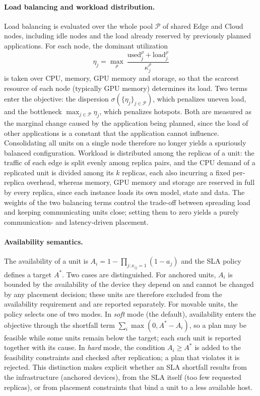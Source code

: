 \paragraph{Load balancing and workload distribution.}
Load balancing is evaluated over the whole pool $\mathcal{P}$ of shared Edge
and Cloud nodes, including idle nodes and the load already reserved by
previously planned applications. For each node, the dominant utilization
\begin{equation}
\eta_j = \max_{\rho}\ \frac{\text{used}_j^{\rho} + \text{load}_j^{\rho}}{\kappa_j^{\rho}}
\end{equation}
is taken over CPU, memory, GPU memory and storage, so that the scarcest
resource of each node (typically GPU memory) determines its load. Two terms
enter the objective: the dispersion $\sigma(\{\eta_j\}_{j\in\mathcal{P}})$,
which penalizes uneven load, and the bottleneck $\max_{j\in\mathcal{P}}\eta_j$,
which penalizes hotspots. Both are measured as the marginal change caused by
the application being planned, since the load of other applications is a
constant that the application cannot influence. Consolidating all units on a
single node therefore no longer yields a spuriously balanced configuration.
Workload is distributed among the replicas of a unit: the traffic of each edge
is split evenly among replica pairs, and the CPU demand of a replicated unit is
divided among its $k$ replicas, each also incurring a fixed per-replica
overhead, whereas memory, GPU memory and storage are reserved in full by every
replica, since each instance loads its own model, state and data. The weights
of the two balancing terms control the trade-off between spreading load and
keeping communicating units close; setting them to zero yields a purely
communication- and latency-driven placement.

\paragraph{Availability semantics.}
The availability of a unit is $A_i = 1-\prod_{j:x_{ij}=1}(1-a_j)$ and the SLA
policy defines a target $A^\ast$. Two cases are distinguished. For anchored
units, $A_i$ is bounded by the availability of the device they depend on and
cannot be changed by any placement decision; these units are therefore
excluded from the availability requirement and are reported separately. For
movable units, the policy selects one of two modes. In \emph{soft} mode (the
default), availability enters the objective through the shortfall term
$\sum_i \max(0, A^\ast - A_i)$, so a plan may be feasible while some units
remain below the target; each such unit is reported together with its cause.
In \emph{hard} mode, the condition $A_i \ge A^\ast$ is added to the
feasibility constraints and checked after replication; a plan that violates it
is rejected. This distinction makes explicit whether an SLA shortfall results
from the infrastructure (anchored devices), from the SLA itself (too few
requested replicas), or from placement constraints that bind a unit to a less
available host.

